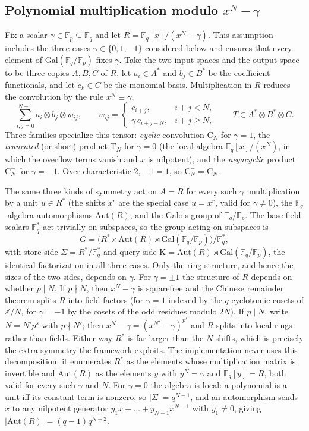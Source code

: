 \documentclass[11pt]{article}
\theoremstyle{definition}
\newcommand{\F}{\mathbb{F}}
\newcommand{\Cyct}[1]{\mathrm{C}_{#1}}
\newcommand{\Trunct}[1]{\mathrm{T}_{#1}}
\newcommand{\Negat}[1]{\mathrm{C}^{-}_{#1}}
\newcommand{\Gal}{\mathrm{Gal}}
\newcommand{\Aut}{\mathrm{Aut}}
\newcommand{\Kappa}{\mathrm{K}}
\begin{document}
\subsection{Polynomial multiplication modulo \texorpdfstring{$x^N-\gamma$}{x to the N minus gamma}}

Fix a scalar $\gamma\in\F_p\subseteq\F_q$ and let
$R=\F_q[x]/(x^N-\gamma)$. This assumption includes the three cases
$\gamma\in\{0,1,-1\}$ considered below and ensures that every element of
$\Gal(\F_q/\F_p)$ fixes $\gamma$. Take the two input spaces and the output space
to be three copies $A,B,C$ of $R$, let $a_i\in A^*$
and $b_j\in B^*$ be the coefficient functionals, and let $c_k\in C$ be the
monomial basis. Multiplication in $R$ reduces the convolution by the rule
$x^N\equiv\gamma$,
\[
  \sum_{i,j=0}^{N-1} a_i\otimes b_j\otimes w_{ij},\qquad
  w_{ij}=
  \begin{cases} c_{i+j},           & i+j<N,    \\[2pt]
    \gamma\,c_{i+j-N}, & i+j\ge N,
  \end{cases}
  \qquad T\in A^*\otimes B^*\otimes C.
\]
Three families specialize this tensor: \emph{cyclic} convolution $\Cyct{N}$ for
$\gamma=1$, the \emph{truncated} (or short) product $\Trunct{N}$ for $\gamma=0$
(the local algebra $\F_q[x]/(x^N)$, in which the overflow terms vanish and $x$ is
nilpotent), and the \emph{negacyclic} product $\Negat{N}$ for $\gamma=-1$. Over
characteristic $2$, $-1=1$, so $\Negat{N}=\Cyct{N}$.

The same three kinds of symmetry act on $A=R$ for every such $\gamma$: multiplication by a
unit $u\in R^*$ (the shifts $x^r$ are the special case $u=x^r$, valid for
$\gamma\ne 0$), the $\F_q$-algebra automorphisms $\Aut(R)$, and the Galois group of
$\F_q/\F_p$. The base-field scalars $\F_q^*$ act trivially on subspaces, so the group
acting on subspaces is
\[
  G = \bigl(R^*\rtimes \Aut(R) \rtimes \Gal(\F_q/\F_p)\bigr)/\F_q^*,
\]
with store side $\Sigma=R^*/\F_q^*$ and query side
$\Kappa=\Aut(R)\rtimes\Gal(\F_q/\F_p)$, the identical factorization in all three
cases. Only the ring structure, and hence the sizes of the two sides, depends on
$\gamma$.
For $\gamma=\pm1$ the structure of $R$ depends on whether $p\mid N$. If $p\nmid N$,
then $x^N-\gamma$ is squarefree and the Chinese remainder theorem splits $R$ into
field factors (for $\gamma=1$ indexed by the $q$-cyclotomic cosets of
$\mathbb{Z}/N$, for $\gamma=-1$ by the cosets of the odd residues modulo $2N$). If
$p\mid N$, write $N=N'p^s$ with $p\nmid N'$; then $x^N-\gamma=(x^{N'}-\gamma)^{p^s}$
and $R$ splits into local rings rather than fields. Either way $R^*$ is far larger
than the $N$ shifts, which is precisely the extra symmetry the framework exploits.
The implementation never uses this decomposition: it enumerates $R^*$ as the
elements whose multiplication matrix is invertible and $\Aut(R)$ as the elements $y$ with
$y^N=\gamma$ and $\F_q[y]=R$, both valid for every such $\gamma$ and $N$.
For $\gamma=0$ the algebra is local: a polynomial is a unit iff
its constant term is nonzero, so $|\Sigma|=q^{N-1}$, and an automorphism sends $x$ to
any nilpotent generator $y_1x+\dots+y_{N-1}x^{N-1}$ with $y_1\ne 0$, giving
$|\Aut(R)|=(q-1)q^{N-2}$.
\end{document}
